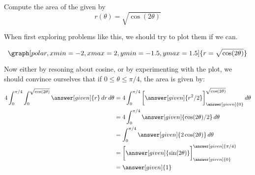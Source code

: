 \documentclass{ximera}
\begin{document}
\begin{example}
  Compute the area of the
   given by
  \[
  r(\theta) = \sqrt{\cos(2\theta)}
  \]
  \begin{explanation}
    When first exploring problems like this, we should try to plot them if we can.
    \begin{onlineOnly}
      \[
      \graph[polar,xmin=-2, xmax=2, ymin=-1.5, ymax=1.5]{r=\sqrt{\cos(2\theta)}}
      \]
    \end{onlineOnly}
    Now either by resoning about cosine, or by experimenting with the
    plot, we should convince ourselves that if $0\le \theta\le \pi/4$,
    the area is given by:
    \begin{align*}
      4\int_{0}^{\pi/4} \int_{0}^{\sqrt{\cos(2\theta)}}\answer[given]{r} \d r \d \theta
      &= 4\int_{0}^{\pi/4} \eval{\answer[given]{r^2/2}}_{\answer[given]{0}}^{\sqrt{\cos(2\theta)}}  \d \theta\\
      &= 4\int_{0}^{\pi/4} \answer[given]{\cos(2\theta)/2}  \d \theta\\
      &= \int_{0}^{\pi/4} \answer[given]{2\cos(2\theta)}  \d \theta\\
      &= \eval{\answer[given]{\sin(2\theta)}}_{\answer[given]{0}}^{\answer[given]{\pi/4}}  \\
      &= \answer[given]{1}
    \end{align*}
  \end{explanation}
\end{example}
\end{document}
